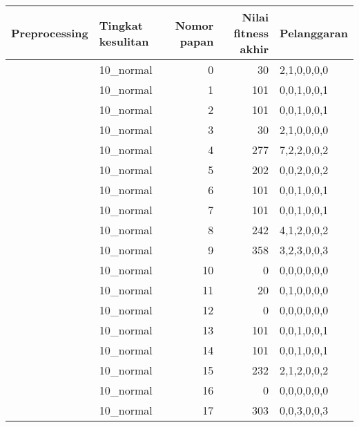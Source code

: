 \begin{tabular}{llrrl}
\hline
 Preprocessing   & Tingkat kesulitan   &   Nomor papan &   Nilai fitness akhir & Pelanggaran   \\
\hline
 [True]          & 10\_normal           &             0 &                    30 & 2,1,0,0,0,0   \\
 [True]          & 10\_normal           &             1 &                   101 & 0,0,1,0,0,1   \\
 [True]          & 10\_normal           &             2 &                   101 & 0,0,1,0,0,1   \\
 [True]          & 10\_normal           &             3 &                    30 & 2,1,0,0,0,0   \\
 [True]          & 10\_normal           &             4 &                   277 & 7,2,2,0,0,2   \\
 [True]          & 10\_normal           &             5 &                   202 & 0,0,2,0,0,2   \\
 [True]          & 10\_normal           &             6 &                   101 & 0,0,1,0,0,1   \\
 [True]          & 10\_normal           &             7 &                   101 & 0,0,1,0,0,1   \\
 [True]          & 10\_normal           &             8 &                   242 & 4,1,2,0,0,2   \\
 [True]          & 10\_normal           &             9 &                   358 & 3,2,3,0,0,3   \\
 [True]          & 10\_normal           &            10 &                     0 & 0,0,0,0,0,0   \\
 [True]          & 10\_normal           &            11 &                    20 & 0,1,0,0,0,0   \\
 [True]          & 10\_normal           &            12 &                     0 & 0,0,0,0,0,0   \\
 [True]          & 10\_normal           &            13 &                   101 & 0,0,1,0,0,1   \\
 [True]          & 10\_normal           &            14 &                   101 & 0,0,1,0,0,1   \\
 [True]          & 10\_normal           &            15 &                   232 & 2,1,2,0,0,2   \\
 [True]          & 10\_normal           &            16 &                     0 & 0,0,0,0,0,0   \\
 [True]          & 10\_normal           &            17 &                   303 & 0,0,3,0,0,3   \\

\end{tabular}
